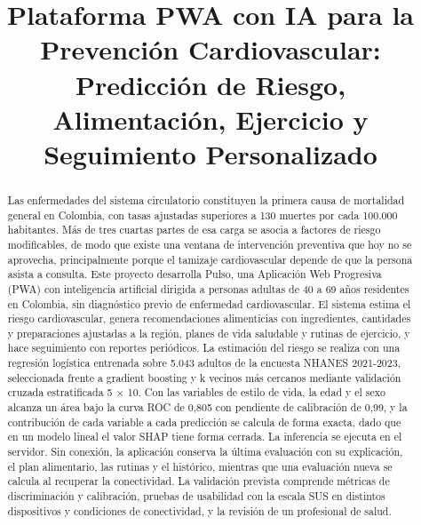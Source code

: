 \documentclass[conference]{IEEEtran}
\begin{document}
\title{Plataforma PWA con IA para la Prevención Cardiovascular: Predicción de Riesgo, Alimentación, Ejercicio y Seguimiento Personalizado}
\author{}
\maketitle
\thispagestyle{usb}
\pagestyle{usb}
\begin{abstract}
Las enfermedades del sistema circulatorio constituyen la primera causa de mortalidad general en Colombia, con tasas ajustadas superiores a 130 muertes por cada 100.000 habitantes. Más de tres cuartas partes de esa carga se asocia a factores de riesgo modificables, de modo que existe una ventana de intervención preventiva que hoy no se aprovecha, principalmente porque el tamizaje cardiovascular depende de que la persona asista a consulta. Este proyecto desarrolla Pulso, una Aplicación Web Progresiva (PWA) con inteligencia artificial dirigida a personas adultas de 40 a 69 años residentes en Colombia, sin diagnóstico previo de enfermedad cardiovascular. El sistema estima el riesgo cardiovascular, genera recomendaciones alimenticias con ingredientes, cantidades y preparaciones ajustadas a la región, planes de vida saludable y rutinas de ejercicio, y hace seguimiento con reportes periódicos. La estimación del riesgo se realiza con una regresión logística entrenada sobre 5.043 adultos de la encuesta NHANES 2021-2023, seleccionada frente a gradient boosting y k vecinos más cercanos mediante validación cruzada estratificada 5 $\times$ 10. Con las variables de estilo de vida, la edad y el sexo alcanza un área bajo la curva ROC de 0{,}805 con pendiente de calibración de 0{,}99, y la contribución de cada variable a cada predicción se calcula de forma exacta, dado que en un modelo lineal el valor SHAP tiene forma cerrada. La inferencia se ejecuta en el servidor. Sin conexión, la aplicación conserva la última evaluación con su explicación, el plan alimentario, las rutinas y el histórico, mientras que una evaluación nueva se calcula al recuperar la conectividad. La validación prevista comprende métricas de discriminación y calibración, pruebas de usabilidad con la escala SUS en distintos dispositivos y condiciones de conectividad, y la revisión de un profesional de salud.
\end{abstract}
\end{document}

